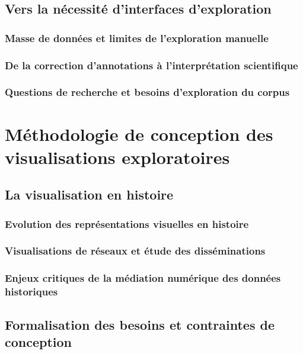 \documentclass[a4paper,12pt,twoside]{book}
\newcommand{\clearemptydoublepage}{\newpage{\pagestyle{empty}\cleardoublepage}}
\begin{document}
	\clearemptydoublepage

	\chapter{Vers la nécessité d'interfaces d'exploration}
	\section{Masse de données et limites de l'exploration manuelle}

	\section{De la correction d'annotations à l'interprétation scientifique}

	\section{Questions de recherche et besoins d'exploration du corpus}

	\clearemptydoublepage

	\part{Méthodologie de conception des visualisations exploratoires}
	\chapter{La visualisation en histoire}
	\section{Evolution des représentations visuelles en histoire}

	\section{Visualisations de réseaux et étude des disséminations}

	\section{Enjeux critiques de la médiation numérique des données historiques}

	\clearemptydoublepage

	\chapter{Formalisation des besoins et contraintes de conception}
\end{document}
